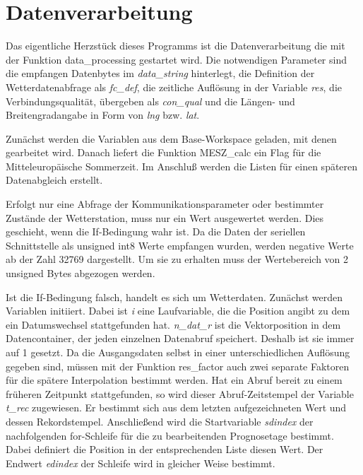 \section{Datenverarbeitung}

Das eigentliche Herzstück dieses Programms ist die Datenverarbeitung die mit der Funktion \textsf{data\_processing} gestartet wird. Die notwendigen Parameter sind die empfangen Datenbytes im \textit{data\_string} hinterlegt, die Definition der Wetterdatenabfrage als \textit{fc\_def}, die zeitliche Auflösung in der Variable \textit{res}, die Verbindungsqualität, übergeben als \textit{con\_qual} und die Längen- und Breitengradangabe in Form von \textit{lng} bzw. \textit{lat}. 

Zunächst werden die Variablen aus dem Base-Workspace geladen, mit denen gearbeitet wird. Danach liefert die Funktion \textsf{MESZ\_calc} ein Flag für die Mitteleuropäische Sommerzeit. Im Anschluß werden die Listen für einen späteren Datenabgleich erstellt.        

Erfolgt nur eine Abfrage der Kommunikationsparameter oder bestimmter Zustände der Wetterstation, muss nur ein Wert ausgewertet werden. Dies geschieht, wenn die If-Bedingung wahr ist. Da die Daten der seriellen Schnittstelle als unsigned int8 Werte empfangen wurden, werden negative Werte ab der Zahl 32769 dargestellt. Um sie zu erhalten muss der Wertebereich von 2 unsigned Bytes abgezogen werden.  

Ist die If-Bedingung falsch, handelt es sich um Wetterdaten. Zunächst werden Variablen initiiert. Dabei ist \textit{i} eine Laufvariable, die die Position angibt zu dem ein Datumswechsel stattgefunden hat. \textit{n\_dat\_r} ist die Vektorposition in dem Datencontainer, der jeden einzelnen Datenabruf speichert. Deshalb ist sie immer auf 1 gesetzt. Da die Ausgangsdaten selbst in einer unterschiedlichen Auflösung gegeben sind, müssen mit der Funktion \textsf{res\_factor} auch zwei separate Faktoren für die spätere Interpolation bestimmt werden. Hat ein Abruf bereit zu einem früheren Zeitpunkt stattgefunden, so wird dieser Abruf-Zeitstempel der Variable \textit{t\_rec} zugewiesen. Er bestimmt sich aus dem letzten aufgezeichneten Wert und dessen Rekordstempel. Anschließend wird die Startvariable \textit{sdindex} der nachfolgenden for-Schleife für die zu bearbeitenden Prognosetage bestimmt. Dabei definiert die Position in der entsprechenden Liste diesen Wert. Der Endwert \textit{edindex} der Schleife wird in gleicher Weise bestimmt.   
